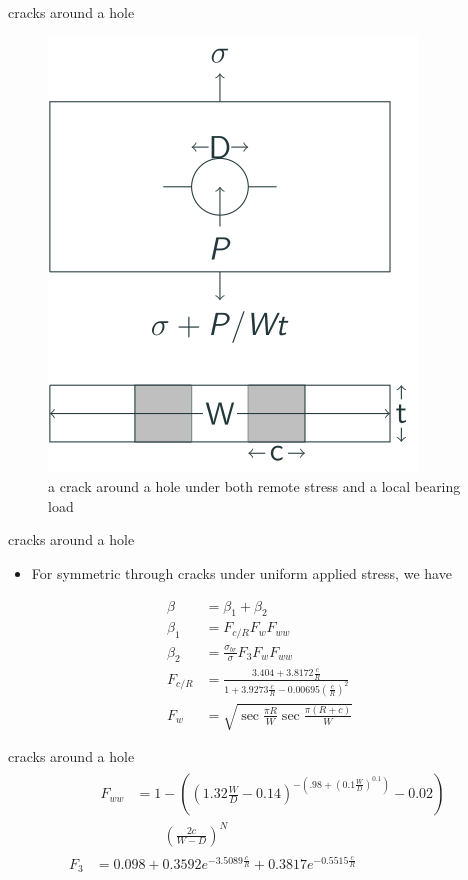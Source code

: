 \documentclass[
  letterpaper,
  ignorenonframetext,
  aspectratio=43,
  handout,
  12pt]{beamer}
\providecommand{\tightlist}{%
  \setlength{\itemsep}{0pt}\setlength{\parskip}{0pt}}
\providecommand{\tightlist}{%
\setlength{\itemsep}{0pt}\setlength{\parskip}{0pt}}
\let\Oldincludegraphics\includegraphics
\renewcommand{\includegraphics}[2][]{\Oldincludegraphics[width=\textwidth,height=0.7\textheight,keepaspectratio]{#2}}
\begin{document}
\begin{frame}{cracks around a hole}
\protect\hypertarget{cracks-around-a-hole}{}
\begin{figure}
\centering
\includegraphics{../images/bearing-through.svg}
\caption{a crack around a hole under both remote stress and a local
bearing load}
\end{figure}
\end{frame}

\begin{frame}{cracks around a hole}
\protect\hypertarget{cracks-around-a-hole-1}{}
\begin{itemize}
\tightlist
\item
  For symmetric through cracks under uniform applied stress, we have
\end{itemize}

\[\begin{aligned}
    \beta &= \beta_1 + \beta_2\\
    \beta_1 &= F_{c/R}F_wF_{ww}\\
    \beta_2 &= \frac{\sigma_{br}}{\sigma} F_3 F_w F_{ww}\\
    F_{c/R} &= \frac{3.404 + 3.8172 \frac{c}{R}}{1 + 3.9273\frac{c}{R} - 0.00695 \left(\frac{c}{R}\right)^2 }\\
    F_w &= \sqrt{\sec \frac{\pi R}{W} \sec \frac{\pi (R+c)}{W}}
\end{aligned}\]
\end{frame}

\begin{frame}{cracks around a hole}
\protect\hypertarget{cracks-around-a-hole-2}{}
\[\begin{aligned}
    &\begin{aligned}
    F_{ww} &= 1- \left(\left(1.32 \frac{W}{D} - 0.14\right)^{-(.98+\left(0.1\frac{W}{D}\right)^{0.1})}-0.02\right)\\
    &\qquad \left(\frac{2c}{W-D}\right)^N
    \end{aligned}\\
    F_3 &= 0.098 + 0.3592 e^{-3.5089\frac{c}{R}} + 0.3817 e^{-0.5515 \frac{c}{R}}
\end{aligned}\]
\end{frame}
\end{document}
